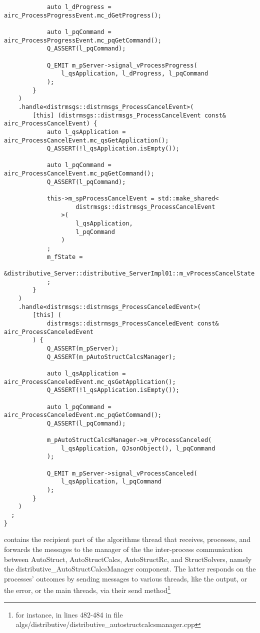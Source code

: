 \begin{verbatim}
            auto l_dProgress =  airc_ProcessProgressEvent.mc_dGetProgress();

            auto l_pqCommand = airc_ProcessProgressEvent.mc_pqGetCommand();
            Q_ASSERT(l_pqCommand);

            Q_EMIT m_pServer->signal_vProcessProgress(
                l_qsApplication, l_dProgress, l_pqCommand
            );
        }
    )
    .handle<distrmsgs::distrmsgs_ProcessCancelEvent>(
        [this] (distrmsgs::distrmsgs_ProcessCancelEvent const& airc_ProcessCancelEvent) {
            auto l_qsApplication = airc_ProcessCancelEvent.mc_qsGetApplication();
            Q_ASSERT(!l_qsApplication.isEmpty());

            auto l_pqCommand = airc_ProcessCancelEvent.mc_pqGetCommand();
            Q_ASSERT(l_pqCommand);

            this->m_spProcessCancelEvent = std::make_shared<
                    distrmsgs::distrmsgs_ProcessCancelEvent
                >(
                    l_qsApplication,
                    l_pqCommand
                )
            ;
            m_fState = 
                &distributive_Server::distributive_ServerImpl01::m_vProcessCancelState
            ;
        }
    )
    .handle<distrmsgs::distrmsgs_ProcessCanceledEvent>(
        [this] (
            distrmsgs::distrmsgs_ProcessCanceledEvent const& airc_ProcessCanceledEvent
        ) {
            Q_ASSERT(m_pServer);
            Q_ASSERT(m_pAutoStructCalcsManager);

            auto l_qsApplication = airc_ProcessCanceledEvent.mc_qsGetApplication();
            Q_ASSERT(!l_qsApplication.isEmpty());

            auto l_pqCommand = airc_ProcessCanceledEvent.mc_pqGetCommand();
            Q_ASSERT(l_pqCommand);

            m_pAutoStructCalcsManager->m_vProcessCanceled(
                l_qsApplication, QJsonObject(), l_pqCommand
            );

            Q_EMIT m_pServer->signal_vProcessCanceled(
                l_qsApplication, l_pqCommand
            );
        }
    )
  ;
}

\end{verbatim}
contains the recipient part of the algorithms thread that receives, processes, and forwards the messages to the manager of the the inter-process communication between AutoStruct, AutoStructCalcs, AutoStructRc, and StructSolvers, namely the distributive\_AutoStructCalcsManager component. The latter responds on the processes' outcomes by sending messages to various threads, like the output, or the error, or the main threads, via their send method\footnote{for instance, in lines 482-484 in file algs/distributive/distributive\_autostructcalcsmanager.cpp}
